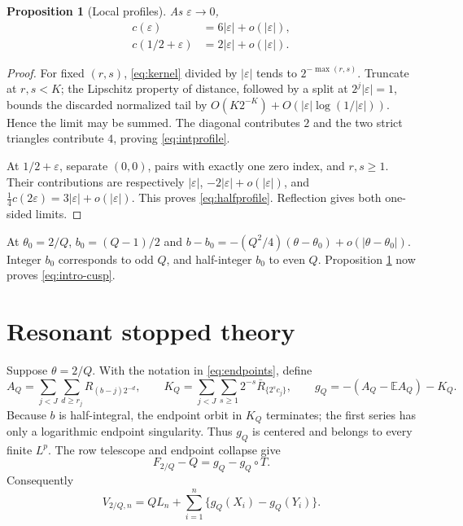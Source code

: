 \documentclass[11pt]{article}
\numberwithin{equation}{section}
\newtheorem{proposition}[theorem]{Proposition}
\theoremstyle{definition}\newtheorem{definition}[theorem]{Definition}
\theoremstyle{remark}\newtheorem{remark}[theorem]{Remark}
\newcommand{\E}{\mathbb E}\newcommand{\Pp}{\mathbb P}
\newcommand{\1}{\mathbf 1}\newcommand{\cD}{\mathcal D}
\begin{document}
\begin{proposition}[Local profiles]\label{prop:cusp}
As $\varepsilon\to0$,
\begin{align}
 c(\varepsilon)&=6|\varepsilon|+o(|\varepsilon|),              \label{eq:intprofile}\\
 c(1/2+\varepsilon)&=2|\varepsilon|+o(|\varepsilon|).           \label{eq:halfprofile}
\end{align}
\end{proposition}
\begin{proof}
For fixed $(r,s)$, \eqref{eq:kernel} divided by $|\varepsilon|$ tends to
$2^{-\max(r,s)}$.  Truncate at $r,s<K$; the Lipschitz property of distance,
followed by a split at $2^j|\varepsilon|=1$, bounds the discarded normalized
tail by $O(K2^{-K})+O(|\varepsilon|\log(1/|\varepsilon|))$.  Hence the limit
may be summed.  The diagonal contributes $2$ and the two strict triangles
contribute $4$, proving \eqref{eq:intprofile}.

At $1/2+\varepsilon$, separate $(0,0)$, pairs with exactly one zero index,
and $r,s\ge1$.  Their contributions are respectively
$|\varepsilon|$, $-2|\varepsilon|+o(|\varepsilon|)$, and
$\frac14c(2\varepsilon)=3|\varepsilon|+o(|\varepsilon|)$.  This proves
\eqref{eq:halfprofile}.  Reflection gives both one-sided limits.
\end{proof}

At $\theta_0=2/Q$, $b_0=(Q-1)/2$ and
$b-b_0=-(Q^2/4)(\theta-\theta_0)+o(|\theta-\theta_0|)$.  Integer $b_0$
corresponds to odd $Q$, and half-integer $b_0$ to even $Q$.  Proposition
\ref{prop:cusp} now proves \eqref{eq:intro-cusp}.

\clearpage
\section{Resonant stopped theory}\label{sec:resstop}
Suppose $\theta=2/Q$.  With the notation in \eqref{eq:endpoints}, define
\begin{equation}
 A_Q=\sum_{j<J}\sum_{d\ge r_j}R_{(b-j)2^{-d}},\qquad
 K_Q=\sum_{j<J}\sum_{s\ge1}2^{-s}\bar R_{\{2^sc_j\}},
 \qquad g_Q=-(A_Q-\E A_Q)-K_Q.                           \label{eq:gQ}
\end{equation}
Because $b$ is half-integral, the endpoint orbit in $K_Q$ terminates; the
first series has only a logarithmic endpoint singularity.  Thus $g_Q$ is
centered and belongs to every finite $L^p$.  The row telescope and endpoint
collapse give
\begin{equation}F_{2/Q}-Q=g_Q-g_Q\circ T.                    \label{eq:cobQ}
\end{equation}
Consequently
\begin{equation}
 V_{2/Q,n}=QL_n+\sum_{i=1}^n\{g_Q(X_i)-g_Q(Y_i)\}.             \label{eq:VQ}
\end{equation}
\end{document}
